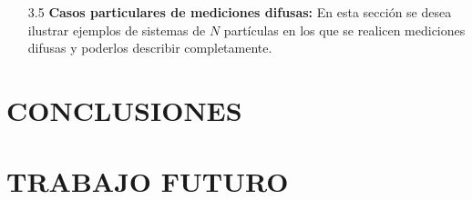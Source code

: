 \documentclass[12pt,oneside]{book}\raggedbottom{} %
\begin{document}
\begin{sloppypar}
{{\begin{itemize}
\item[3.5] \textbf{Casos particulares de mediciones difusas:}
En esta sección se desea ilustrar ejemplos de sistemas de $N$ partículas en los que se realicen mediciones difusas y poderlos describir completamente.

\end{itemize}
\section*{CONCLUSIONES }
\section*{TRABAJO FUTURO}

\nocite{Hall2013}
\nocite{sakurai2017modern}
\nocite{wilde2011classical}
\nocite{2007geometry}
}

\newpage
\nocite{gomez2010introduccion}



}
\end{sloppypar}
\end{document}
